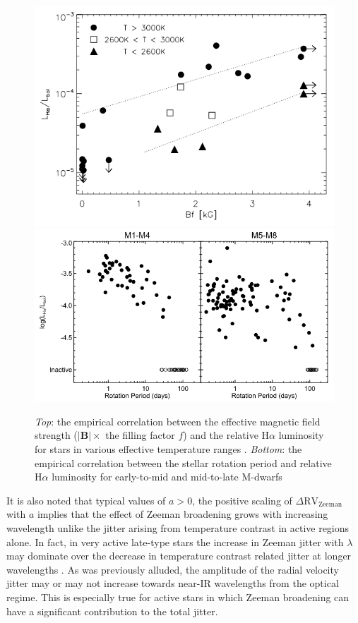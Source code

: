 \begin{figure}
\centering
\includegraphics[scale=.4]{figures/LHalpha_B.png}
\includegraphics[scale=.4]{figures/LHalpha_Prot.png}
\caption{\emph{Top}: the empirical correlation between the effective magnetic field strength 
($|\mathbf{B}| \times$ the filling factor $f$) and the relative H$\alpha$ luminosity for 
stars in various effective temperature ranges \parencite[Image credit:][]{reiners07}. 
\emph{Bottom}: the empirical correlation 
between the stellar rotation period and relative H$\alpha$ luminosity for early-to-mid and 
mid-to-late M-dwarfs \parencite[Image credit:][]{west15} \label{fig:Bfields}}
\end{figure}

It is also noted that typical values of $a>0$, the positive scaling of 
$\Delta \mathrm{RV}_{\mathrm{Zeeman}}$ with 
$a$ implies that the effect of Zeeman broadening grows with increasing wavelength unlike the 
jitter arising 
from temperature contrast in active regions alone. In fact, in very active late-type stars 
the increase in Zeeman jitter with $\lambda$ may dominate over the decrease in temperature 
contrast related jitter at longer wavelengths \parencite{reiners13}. As was previously alluded, 
the amplitude of the radial velocity jitter may or may not increase towards near-IR wavelengths 
from the optical regime. This is especially true for 
active stars in which Zeeman broadening can have a 
significant contribution to the total jitter.


